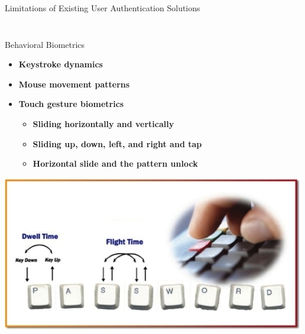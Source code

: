 \documentclass[aspectratio=43]{beamer}
\begin{document}
\begin{frame}{Limitations of Existing User Authentication Solutions}
\begin{columns}
\begin{column}{0.48\textwidth}
{        }
    \end{column}
\end{columns}

\end{frame}



\begin{frame}{Behavioral Biometrics}
    \begin{itemize}
    \item \textbf{Keystroke dynamics} \cite{monrose1997authentication}
    \item \textbf{Mouse movement patterns} \cite{zheng2011efficient}
    \item \textbf{Touch gesture biometrics}
    \begin{itemize}
    \item \textbf{Sliding horizontally and vertically} \cite{frank2012touchalytics}
    \item \textbf{Sliding up, down, left,  and right and tap } \cite{li2013unobservable}
    \item \textbf{Horizontal slide and the pattern unlock} \cite{de2012touch}
    \end{itemize}
    \end{itemize}
    
    
    \begin{center}
    \includegraphics[width=0.6\linewidth]{Figures/bio2}
    \end{center}
\end{frame}
\end{document}

